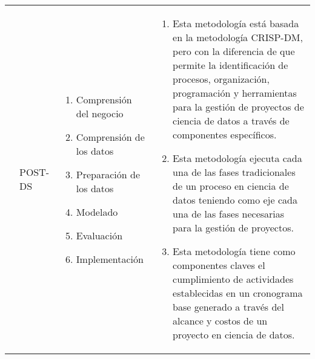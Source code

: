 \begin{table*}[!htb]
\begin{threeparttable}
\begin{tabular}{p{1cm} p{2cm} p{5cm} p{6.5cm}}
			\cite{Costa2020}
			&POST-DS
			&  \begin{enumerate}
				\item Comprensión del negocio
				\item Comprensión de los datos
				\item Preparación de los datos
				\item Modelado
				\item Evaluación 
				\item Implementación 
			\end{enumerate}
			& \begin{enumerate}
				\item Esta metodología está basada en la metodología CRISP-DM, pero con la diferencia de que permite la identificación de procesos, organización, programación y herramientas para la gestión de proyectos de ciencia de datos a través de componentes específicos.
				\item Esta metodología ejecuta cada una de las fases tradicionales de un proceso en ciencia de datos teniendo como eje cada una de las fases necesarias para la gestión de proyectos.
				\item Esta metodología tiene como componentes claves el cumplimiento de actividades establecidas en un cronograma base generado a través del alcance y costos de un proyecto en ciencia de datos.
			\end{enumerate}
		\end{tabular}
	\end{threeparttable}
\end{table*}

